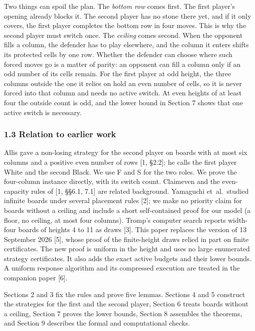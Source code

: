 \documentclass[
  a4paper,
]{article}
\begin{document}
Two things can spoil the plan. The \emph{bottom row} comes first. The
first player's opening already blocks it. The second player has no stone
there yet, and if it only covers, the first player completes the bottom
row in four moves. This is why the second player must switch once. The
\emph{ceiling} comes second. When the opponent fills a column, the
defender has to play elsewhere, and the column it enters shifts its
protected cells by one row. Whether the defender can choose where such
forced moves go is a matter of parity: an opponent can fill a column
only if an odd number of its cells remain. For the first player at odd
height, the three columns outside the one it relies on hold an even
number of cells, so it is never forced into that column and needs no
active switch. At even heights of at least four the outside count is
odd, and the lower bound in Section 7 shows that one active switch is
necessary.

\subsubsection{1.3 Relation to earlier
work}\label{relation-to-earlier-work}

Allis gave a non-losing strategy for the second player on boards with at
most six columns and a positive even number of rows {[}1, §2.2{]}; he
calls the first player White and the second Black. We use F and S for
the two roles. We prove the four-column instance directly, with its
switch count. Claimeven and the even-capacity rules of {[}1, §§6.1,
7.1{]} are related background. Yamaguchi et~al.~studied infinite boards
under several placement rules {[}2{]}; we make no priority claim for
boards without a ceiling and include a short self-contained proof for
our model (a floor, no ceiling, at most four columns). Tromp's computer
search reports width-four boards of heights 4 to 11 as draws {[}3{]}.
This paper replaces the version of 13 September 2026 {[}5{]}, whose
proof of the finite-height draws relied in part on finite certificates.
The new proof is uniform in the height and uses no large enumerated
strategy certificates. It also adds the exact active budgets and their
lower bounds. A uniform response algorithm and its compressed execution
are treated in the companion paper {[}6{]}.

Sections 2 and 3 fix the rules and prove five lemmas. Sections 4 and 5
construct the strategies for the first and the second player, Section 6
treats boards without a ceiling, Section 7 proves the lower bounds,
Section 8 assembles the theorems, and Section 9 describes the formal and
computational checks.
\end{document}
